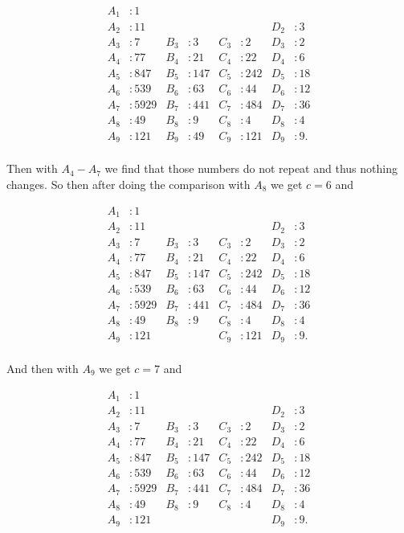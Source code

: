 \documentclass[12pt, a4paper]{article}
\begin{document}
\begin{align*}
        A_1 & : 1 &  &  &  &  &  & \\
        A_2 & : 11 &  &  &  &  & D_2 & : 3\\ 
        A_3 & : 7 & B_3 & : 3 & C_3 & : 2& D_3 & : 2\\ 
        A_4 & : 77 & B_4 & : 21 & C_4 & : 22& D_4 & : 6\\
        A_5 & : 847 & B_5 & : 147& C_5 & : 242& D_5 & : 18\\ 
        A_6 & : 539& B_6 & : 63& C_6 & : 44& D_6 & : 12\\ 
        A_7 & : 5929& B_7 & :441 & C_7 & : 484& D_7 & : 36 \\ 
        A_8 & : 49& B_8 & : 9 & C_8 & : 4& D_8 & : 4 \\ 
        A_9 & : 121& B_9 & : 49 & C_9 & :121 & D_9 & : 9. \\ 
\end{align*}

\newpage

Then with $A_4-A_7$ we find that those numbers do not repeat and thus nothing changes. So then after doing the comparison with $A_8$ we get $c=6$ and

\begin{align*}
        A_1 & : 1 &  &  &  &  &  & \\
        A_2 & : 11 &  &  &  &  & D_2 & : 3\\ 
        A_3 & : 7 & B_3 & : 3 & C_3 & : 2& D_3 & : 2\\ 
        A_4 & : 77 & B_4 & : 21 & C_4 & : 22& D_4 & : 6\\
        A_5 & : 847 & B_5 & : 147& C_5 & : 242& D_5 & : 18\\ 
        A_6 & : 539& B_6 & : 63& C_6 & : 44& D_6 & : 12\\ 
        A_7 & : 5929& B_7 & :441 & C_7 & : 484& D_7 & : 36 \\ 
        A_8 & : 49& B_8 & : 9 & C_8 & : 4& D_8 & : 4 \\ 
        A_9 & : 121& & & C_9 & :121 & D_9 & : 9. \\ 
\end{align*}

\noindent And then with $A_9$ we get $c=7$ and

\begin{align*}
        A_1 & : 1 &  &  &  &  &  & \\
        A_2 & : 11 &  &  &  &  & D_2 & : 3\\ 
        A_3 & : 7 & B_3 & : 3 & C_3 & : 2& D_3 & : 2\\ 
        A_4 & : 77 & B_4 & : 21 & C_4 & : 22& D_4 & : 6\\
        A_5 & : 847 & B_5 & : 147& C_5 & : 242& D_5 & : 18\\ 
        A_6 & : 539& B_6 & : 63& C_6 & : 44& D_6 & : 12\\ 
        A_7 & : 5929& B_7 & :441 & C_7 & : 484& D_7 & : 36 \\ 
        A_8 & : 49& B_8 & : 9 & C_8 & : 4& D_8 & : 4 \\ 
        A_9 & : 121& & & & & D_9 & : 9. \\ 
\end{align*}
\end{document}
